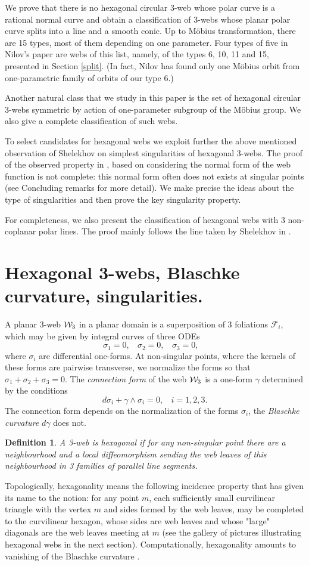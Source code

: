 \documentclass[11pt,a4paper]{article}
\newtheorem{definition}{Definition}
\begin{document}
We prove that there is no hexagonal circular 3-web whose polar curve is a rational normal curve and obtain a classification of 3-webs whose planar polar curve splits into a line and a smooth conic. Up to Möbius transformation, there are 15 types, most of them depending on one parameter. Four types of five in Nilov's paper \cite{N-14}  are webs  of this list, namely, of the types 6, 10, 11 and 15, presented in Section \ref{split}. (In fact, Nilov has found only one Möbius orbit from one-parametric family of orbits of our type 6.)  

Another natural class that we study in this paper is the set of hexagonal circular 3-webs symmetric by action of  one-parameter  subgroup of the Möbius group. We also give a complete classification of such webs.     

To select candidates for hexagonal webs we exploit further the above mentioned observation of Shelekhov on simplest singularities of hexagonal 3-webs. The proof of the observed property in \cite{S-05}, based on considering the normal form  of the web function is not complete: this normal  form often does not exists at singular points (see Concluding remarks for more detail). We make precise the ideas about the type of singularities and then prove the key singularity property. 

For completeness, we also present the classification of hexagonal webs with 3 non-coplanar polar lines. The proof mainly follows the line taken by Shelekhov in \cite{S-05}. 

\section{Hexagonal 3-webs, Blaschke curvature, singularities.}
A planar 3-web ${\cal W}_3$  in a planar domain is a superposition of 3 foliations $\mathcal{F}_i$, which  may be given by integral curves of three ODEs 
$$
\sigma _1=0,\ \ \ \ \sigma _2=0,\ \ \ \ \sigma _3=0,\ \ \ \ 
$$
where $\sigma _i$ are differential one-forms. At non-singular points, where the kernels of these forms are pairwise transverse, we normalize the forms  so that 
$\sigma_1+\sigma_2+\sigma_3=0.$ The {\it connection form} of the web ${\cal W}_3$ is a one-form $\gamma$ determined by the conditions
$$
d\sigma_i+\gamma \wedge \sigma_i=0,\ \ \ \ i=1,2,3.
$$
The connection form depends on the normalization of the forms $\sigma_i$, the {\it Blaschke curvature} $d\gamma$ does not.
\begin{definition}
A  3-web is hexagonal if for any non-singular point there are a neighbourhood and a local diffeomorphism sending the web leaves of this neighbourhood  in 3 families of parallel line segments.   
\end{definition}
Topologically, hexagonality means the following incidence property  that has given its name to the notion:  for any point $m$, each sufficiently small curvilinear triangle with the vertex $m$ and sides formed by the web leaves,  may be completed to the curvilinear hexagon, whose sides are web leaves and whose "large" diagonals are the web leaves meeting at $m$ (see the gallery of pictures illustrating hexagonal webs in the next section). Computationally, hexagonality amounts to vanishing of the Blaschke curvature \cite{BB-38}. 
\end{document}
